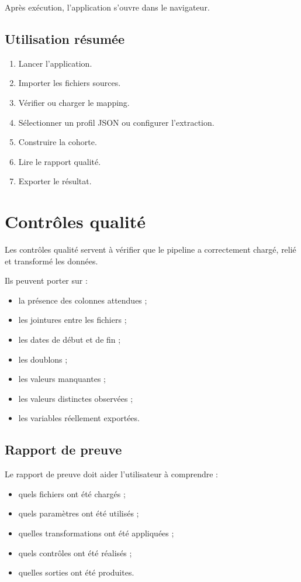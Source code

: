 \documentclass[11pt,a4paper]{article}
\begin{document}
Après exécution, l'application s'ouvre dans le navigateur.

\subsection{Utilisation résumée}

\begin{enumerate}
  \item Lancer l'application.
  \item Importer les fichiers sources.
  \item Vérifier ou charger le mapping.
  \item Sélectionner un profil JSON ou configurer l'extraction.
  \item Construire la cohorte.
  \item Lire le rapport qualité.
  \item Exporter le résultat.
\end{enumerate}

\section{Contrôles qualité}

Les contrôles qualité servent à vérifier que le pipeline a correctement chargé, relié et transformé les données.

Ils peuvent porter sur :
\begin{itemize}
  \item la présence des colonnes attendues ;
  \item les jointures entre les fichiers ;
  \item les dates de début et de fin ;
  \item les doublons ;
  \item les valeurs manquantes ;
  \item les valeurs distinctes observées ;
  \item les variables réellement exportées.
\end{itemize}

\subsection{Rapport de preuve}

Le rapport de preuve doit aider l'utilisateur à comprendre :
\begin{itemize}
  \item quels fichiers ont été chargés ;
  \item quels paramètres ont été utilisés ;
  \item quelles transformations ont été appliquées ;
  \item quels contrôles ont été réalisés ;
  \item quelles sorties ont été produites.
\end{itemize}
\end{document}
